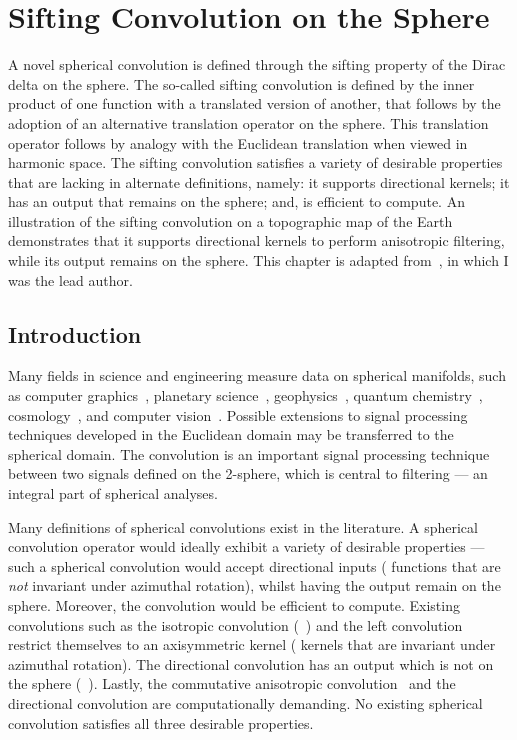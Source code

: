 \chapter{Sifting Convolution on the Sphere}\label{sec:chapter3}

A novel spherical convolution is defined through the sifting property of the Dirac delta on the sphere.
The so-called sifting convolution is defined by the inner product of one function with a translated version of another, that follows by the adoption of an alternative translation operator on the sphere.
This translation operator follows by analogy with the Euclidean translation when viewed in harmonic space.
The sifting convolution satisfies a variety of desirable properties that are lacking in alternate definitions, namely: it supports directional kernels; it has an output that remains on the sphere; and, is efficient to compute.
An illustration of the sifting convolution on a topographic map of the Earth demonstrates that it supports directional kernels to perform anisotropic filtering, while its output remains on the sphere.
This chapter is adapted from~\cite{Roddy2021}, in which I was the lead author.

\section{Introduction}

Many fields in science and engineering measure data on spherical manifolds, such as computer graphics~\cite{Ramamoorthi2004}, planetary science~\cite{Turcotte1981}, geophysics~\cite{Simons2006}, quantum chemistry~\cite{Choi1999}, cosmology~\cite{Bennett1996}, and computer vision~\cite{Cohen2018,Esteves2020,Cobb2021}.
Possible extensions to signal processing techniques developed in the Euclidean domain may be transferred to the spherical domain.
The convolution is an important signal processing technique between two signals defined on the 2-sphere, which is central to filtering --- an integral part of spherical analyses.

Many definitions of spherical convolutions exist in the literature.
A spherical convolution operator would ideally exhibit a variety of desirable properties --- such a spherical convolution would accept directional inputs (\ie{} functions that are \emph{not} invariant under azimuthal rotation), whilst having the output remain on the sphere.
Moreover, the convolution would be efficient to compute.
Existing convolutions such as the isotropic convolution (\eg{}~\cite{McEwen2007,Wei2011,Kennedy2011}) and the left convolution~\cite{Kennedy2011,Driscoll1994} restrict themselves to an axisymmetric kernel (\ie{} kernels that are invariant under azimuthal rotation).
The directional convolution has an output which is not on the sphere (\eg{}~\cite{McEwen2007,Wandelt2001}).
Lastly, the commutative anisotropic convolution~\cite{Sadeghi2012,Khalid2012} and the directional convolution are computationally demanding.
No existing spherical convolution satisfies all three desirable properties.

